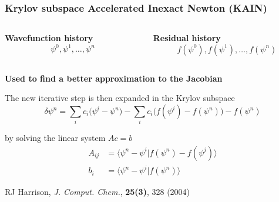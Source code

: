 \begin{frame}
    \frametitle{Krylov subspace Accelerated Inexact Newton (KAIN)}
    \begin{columns}
    \begin{column}[b]{0.5\textwidth}
    \centering
    \textbf{Wavefunction history}
    \begin{equation}
	\nonumber
	\psi^0, \psi^1, \dots, \psi^n
    \end{equation}
    \end{column}
    \begin{column}[b]{0.5\textwidth}
    \centering
    \textbf{Residual history}
    \begin{equation}
	\nonumber
	f(\psi^0), f(\psi^1), \dots, f(\psi^n)
    \end{equation}
    \end{column}
    \end{columns}

    \vspace{5mm}

    \centering
    \textbf{Used to find a better approximation to the Jacobian}

    \vspace{10mm}

    The new iterative step is then expanded in the Krylov subspace
    \begin{equation}
	\nonumber
	\delta\psi^n = \sum_i c_i\Big(\psi^i-\psi^n\Big) - 
	\sum_i c_i\Big(f(\psi^i) - f(\psi^n)\Big) - f(\psi^n)
    \end{equation}

    \vspace{5mm}

    by solving the linear system $Ac = b$
    \begin{align}
	\nonumber
	A_{ij} &= \langle\psi^n-\psi^i|f(\psi^n) - f(\psi^j)\rangle\\
	\nonumber
	b_{i}  &= \langle\psi^n-\psi^i|f(\psi^n)\rangle
    \end{align}

    \vspace{5mm}

    \centering
    \tiny
    RJ Harrison,
    {\it J. Comput. Chem.}, 
    \textbf{25(3)},
    328 (2004)
\end{frame}

